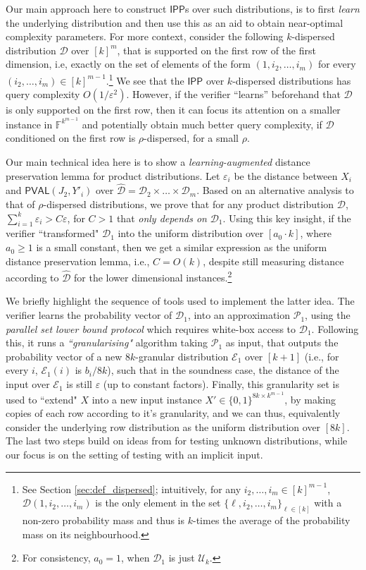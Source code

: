 \documentclass[10pt,a4paper]{article}
\newcommand{\PVAL}{\mathsf{PVAL}}
\newcommand{\IPP}{\mathsf{IPP}}
\newcommand{\F}{\mathbb{F}}
\newcommand{\sU}{\mathcal{U}}
\newcommand{\sD}{\mathcal{D}}
\newcommand{\sP}{\mathcal{P}}
\begin{document}
Our main approach here to construct $\IPP$s over such distributions, is to first \textit{learn} the underlying distribution and then use this as an aid to obtain near-optimal complexity parameters. For more context, consider the following $k$-dispersed distribution $\sD$ over $[k]^m$, that is supported on the first row of the first dimension, i.e, exactly on the set of elements of the form $(1,i_2, \dots, i_m)$ for every $(i_2, \dots, i_m) \in [k]^{m-1}$.\footnote{See Section \ref{sec:def_dispersed}; intuitively, for any $i_2, \dots, i_m \in [k]^{m-1}$, $\sD(1,i_2, \dots, i_m)$ is the only element in the set $\{\ell, i_2, \dots, i_m\}_{\ell \in [k]}$ with a non-zero probability mass and thus is $k$-times the average of the probability mass on its neighbourhood.} We see that the $\IPP$ over $k$-dispersed distributions has query complexity $O(1/\varepsilon^2)$. However, if the verifier ``learns'' beforehand that $\sD$ is only supported on the first row, then it can focus its attention on a smaller instance in $\F^{k^{m-1}}$ and potentially obtain much better query complexity, if $\sD$ conditioned on the first row is $\rho$-dispersed, for a small $\rho$.

Our main technical idea here is to show a \textit{learning-augmented} distance preservation lemma for product distributions. Let $\varepsilon_i$ be the distance between $X_i$ and $\PVAL(J_2, Y'_i)$ over $\hat{\sD} = \sD_2 \times \dots \times \sD_m$. Based on an alternative analysis to that of $\rho$-dispersed distributions, we prove that for any product distribution $\sD$, $\sum_{i=1}^k \varepsilon_i > C \varepsilon$, for $C > 1$ that \textit{only depends on} $\sD_1$. Using this key insight, if the verifier ``transformed" $\sD_1$ into the uniform distribution over $[a_0 \cdot k]$, where $a_0 \geq 1$ is a small constant, then we get a similar expression as the uniform distance preservation lemma, i.e., $C = O(k)$, despite still measuring distance according to $\hat{\sD}$ for the lower dimensional instances.\footnote{For consistency, $a_0 = 1$, when $\sD_1$ is just $\sU_k$.} 

We briefly highlight the sequence of tools used to implement the latter idea. The verifier learns the probability vector of $\sD_1$, into an approximation $\sP_1$, using the \textit{parallel set lower bound protocol} \cite{BT06} which requires white-box access to $\sD_1$. Following this, it runs a \textit{``granularising"} algorithm taking $\sP_1$ as input, that outputs the probability vector of a new $8k$-granular distribution $\mathcal{E}_1$ over $[k+1]$ (i.e., for every $i$, $\mathcal{E}_1(i)$ is $b_i/8k$), such that in the soundness case, the distance of the input over $\mathcal{E}_1$ is still $\varepsilon$ (up to constant factors). Finally, this granularity set is used to ``extend" $X$ into a new input instance $X' \in \{0,1\}^{8k \times k^{m-1}}$, by making copies of each row according to it's granularity, and we can thus, equivalently consider the underlying row distribution as the uniform distribution over $[8k]$. The last two steps build on ideas from \cite{Gol20} for testing unknown distributions, while our focus is on the setting of testing with an implicit input.
\end{document}

